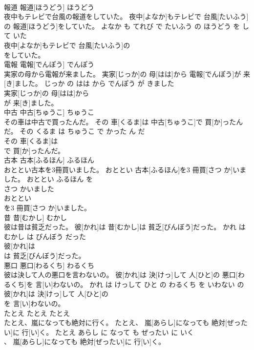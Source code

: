 \documentclass[8pt]{extreport}
\begin{document}
\begin{CJK}{UTF8}{min}
\\	報道	報道[ほうどう]	ほうどう	
\\	夜中もテレビで台風の報道をしていた。	夜中[よなか]もテレビで 台風[たいふう]の 報道[ほうどう]をしていた。	よなか も てれび で たいふう の ほうどう を して いた	
\\	夜中[よなか]もテレビで 台風[たいふう]の
\\	をしていた。			
\\	電報	電報[でんぽう]	でんぽう	
\\	実家の母から電報が来ました。	実家[じっか]の 母[はは]から 電報[でんぽう]が 来[き]ました。	じっか の はは から でんぽう が きました	
\\	実家[じっか]の 母[はは]から
\\	が 来[き]ました。			
\\	中古	中古[ちゅうこ]	ちゅうこ	
\\	その車は中古で買ったんだ。	その 車[くるま]は 中古[ちゅうこ]で 買[か]ったんだ。	その くるま は ちゅうこ で かった ん だ	
\\	その 車[くるま]は
\\	で 買[か]ったんだ。			
\\	古本	古本[ふるほん]	ふるほん	
\\	おととい古本を3冊買いました。	おととい 古本[ふるほん]を3 冊買[さつ か]いました。	おととい ふるほん を 
\\	さつ かいました	
\\	おととい
\\	を3 冊買[さつ か]いました。			
\\	昔	昔[むかし]	むかし	
\\	彼は昔は貧乏だった。	彼[かれ]は 昔[むかし]は 貧乏[びんぼう]だった。	かれ は むかし は びんぼう だった	
\\	彼[かれ]は
\\	は 貧乏[びんぼう]だった。			
\\	悪口	悪口[わるくち]	わるくち	
\\	彼は決して人の悪口を言わないの。	彼[かれ]は 決[けっ]して 人[ひと]の 悪口[わるくち]を 言[い]わないの。	かれ は けっして ひと の わるくち を いわない の	
\\	彼[かれ]は 決[けっ]して 人[ひと]の
\\	を 言[い]わないの。			
\\	たとえ	たとえ	たとえ	
\\	たとえ、嵐になっても絶対に行く。	たとえ、 嵐[あらし]になっても 絶対[ぜったい]に 行[い]く。	たとえ あらし に なって も ぜったい に いく	
\\	、 嵐[あらし]になっても 絶対[ぜったい]に 行[い]く。			

\end{CJK}
\end{document}
